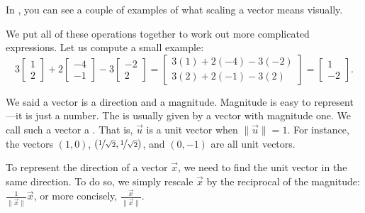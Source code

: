 In , you can see a couple of examples of
what scaling a vector means visually.

\begin{myfig}
\capstart
{}
\caption{A vector $\vec{x}$, the vector $2\vec{x}$ (same direction,
double the magnitude), and the vector $-1.5\vec{x}$ (opposite direction,
1.5 times the magnitude).\label{linalg-vecscale:fig}}
\end{myfig}

We put all of these operations together to work out more complicated expressions.
Let us compute a small example:
\begin{equation*}
3
\begin{bmatrix}
1 \\ 2
\end{bmatrix}
+
2
\begin{bmatrix}
-4 \\ -1
\end{bmatrix}
-
3
\begin{bmatrix}
-2 \\ 2
\end{bmatrix}
=
\begin{bmatrix}
3(1)+2(-4)-3(-2) \\ 3(2)+2(-1)-3(2)
\end{bmatrix}
=
\begin{bmatrix}
1 \\ -2
\end{bmatrix}
.
\end{equation*}

\medskip

We said a vector is a direction and a magnitude.  Magnitude is easy to
represent---it is just a number.  The \emph{} is usually
given by a vector with magnitude one.  We call such a vector a
\emph{}.  That is, $\vec{u}$ is a unit vector when
$\lVert \vec{u} \rVert = 1$.  For instance, the vectors $(1,0)$,
$(\nicefrac{1}{\sqrt{2}},\nicefrac{1}{\sqrt{2}})$, and $(0,-1)$ are all
unit vectors.

To represent the direction of a vector $\vec{x}$, we need to find the
unit vector in the same direction.  To do so, we simply rescale
$\vec{x}$ by the reciprocal of the magnitude:
$\frac{1}{\lVert \vec{x} \rVert} \vec{x}$, or more concisely,
$\frac{\vec{x}}{\lVert \vec{x} \rVert}$.

